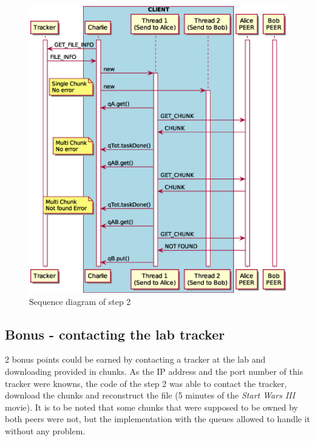 \begin{figure}
	\centering
	\includegraphics[width=\textwidth]{img/step2.eps}
	\caption{Sequence diagram of step 2}
	\label{fig:step2}
\end{figure}

\subsection{Bonus - contacting the lab tracker}

2 bonus points could be earned by contacting a tracker at the lab and downloading provided in chunks. As the IP address and the port number of this tracker were knowns, the code of the step 2 was able to contact the tracker, download the chunks and reconstruct the file (5 minutes of the \textit{Start Wars III} movie). It is to be noted that some chunks that were supposed to be owned by both peers were not, but the implementation with the queues allowed to handle it without any problem.


